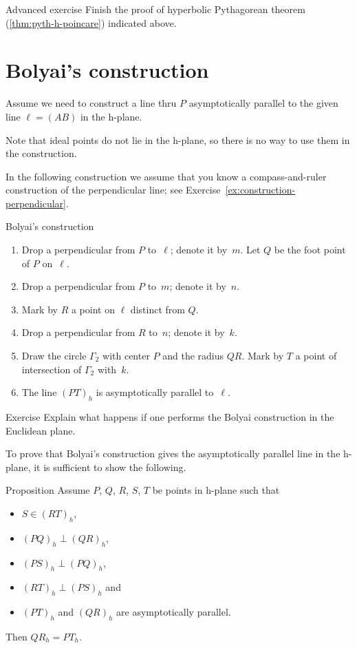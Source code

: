 \begin{thm}{Advanced exercise}\label{ex:pyth-h-proj}
Finish the proof of hyperbolic Pythagorean theorem (\ref{thm:pyth-h-poincare}) indicated above.
\end{thm}


\section*{Bolyai's construction}

Assume we need to construct a line thru $P$ asymptotically parallel to the given line $\ell=(AB)$ in the h-plane.

Note that ideal points do not lie in the h-plane,
so there is no way to use them in the construction.

In the following construction we assume that you know a compass-and-ruler construction of the perpendicular line; see Exercise~\ref{ex:construction-perpendicular}.

\begin{thm}{Bolyai's construction}
\begin{enumerate}
\item Drop a perpendicular from $P$ to~$\ell$; denote it by~$m$.
Let $Q$ be the foot point of $P$ on~$\ell$.
\item Drop a perpendicular from $P$ to~$m$; denote it by~$n$.
\item Mark by $R$ a point on $\ell$ distinct from $Q$.
\item Drop a perpendicular from $R$ to~$n$; denote it by~$k$. 
\item Draw the circle $\Gamma_2$ with center $P$ and the radius $QR$. 
Mark by $T$ a point of intersection of $\Gamma_2$ with~$k$.
\item The line $(PT)_h$ is asymptotically parallel to~$\ell$.
\end{enumerate}
\end{thm}

\begin{thm}{Exercise}\label{ex:Boyai-in-Euclid}
Explain what happens if one performs the Bolyai construction in the Euclidean plane.
\end{thm}

To prove that Bolyai's construction gives the asymptotically parallel line in the h-plane,
it is sufficient to show the following.

\begin{thm}{Proposition}\label{prop:boyai}
Assume $P$, $Q$, $R$, $S$, $T$ be points in h-plane
such that 
\begin{itemize}
\item $S\in (RT)_h$,
\item $(PQ)_h\perp (QR)_h$,
\item $(PS)_h\perp(PQ)_h$,
\item $(RT)_h\perp (PS)_h$ and 
\item $(PT)_h$ and $(QR)_h$ are asymptotically parallel.
\end{itemize}
Then $QR_h=PT_h$.
\end{thm}


